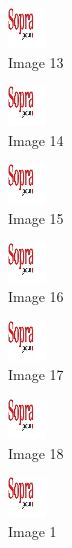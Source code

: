 \begin{figure}[!h]
  \center
  \includegraphics[width=1cm]{img/test.jpg}
  \caption{Image 13}
\end{figure}

\begin{figure}[!h]
  \center
  \includegraphics[width=1cm]{img/test.jpg}
  \caption{Image 14}
\end{figure}

\begin{figure}[!h]
  \center
  \includegraphics[width=1cm]{img/test.jpg}
  \caption{Image 15}
\end{figure}

\begin{figure}[!h]
  \center
  \includegraphics[width=1cm]{img/test.jpg}
  \caption{Image 16}
\end{figure}

\begin{figure}[!h]
  \center
  \includegraphics[width=1cm]{img/test.jpg}
  \caption{Image 17}
\end{figure}

\begin{figure}[h]
  \center
  \includegraphics[width=1cm]{img/test.jpg}
  \caption{Image 18}
\end{figure}

\clearpage

\begin{figure}[!h]
  \center
  \includegraphics[width=1cm]{img/test.jpg}
  \caption{Image 1}
\end{figure}

